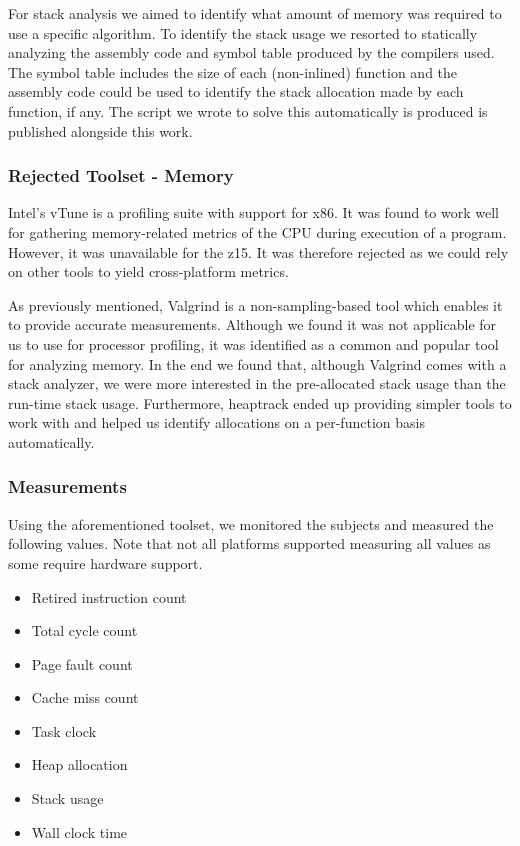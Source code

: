 For stack analysis we aimed to identify what amount of memory was required to use a specific algorithm. To identify the stack usage we resorted to statically analyzing the assembly code and symbol table produced by the compilers used. The symbol table includes the size of each (non-inlined) function and the assembly code could be used to identify the stack allocation made by each function, if any. The script we wrote to solve this automatically is produced is published alongside this work.

\subsubsection{Rejected Toolset - Memory}
\label{section:method:experiment:phase1:rejected-toolset-memory}

Intel's vTune is a profiling suite with support for \gls{x86}. It was found to work well for gathering memory-related metrics of the CPU during execution of a program. However, it was unavailable for the \gls{z15}. It was therefore rejected as we could rely on other tools to yield cross-platform metrics. 

As previously mentioned, Valgrind is a non-sampling-based tool which enables it to provide accurate measurements. Although we found it was not applicable for us to use for processor profiling, it was identified as a common and popular tool for analyzing memory. In the end we found that, although Valgrind comes with a stack analyzer, we were more interested in the pre-allocated stack usage than the run-time stack usage. Furthermore, heaptrack ended up providing simpler tools to work with and helped us identify allocations on a per-function basis automatically.

\subsubsection{Measurements}
\label{section:method:experiment:phase1:measurements}

Using the aforementioned toolset, we monitored the subjects and measured the following values. Note that not all platforms supported measuring all values as some require hardware support.

\begin{itemize}
    \item Retired instruction count
    \item Total cycle count
    \item Page fault count
    \item Cache miss count
    \item Task clock
    \item Heap allocation
    \item Stack usage
    \item Wall clock time
\end{itemize}

